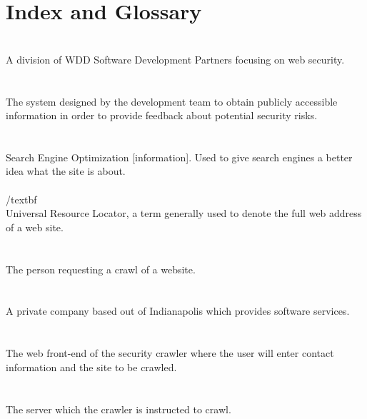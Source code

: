 \section{Index and Glossary}
\textbf{}\\
A division of WDD Software Development Partners focusing on web security.\\\\
\textbf{}\\
The system designed by the development team to obtain publicly accessible information in order to provide feedback about potential security risks.\\\\
\textbf{}\\
Search Engine Optimization [information].  Used to give search engines a better idea what the site is about.\\\\
/textbf{}\\
Universal Resource Locator, a term generally used to denote the full web address of a web site.\\\\
\textbf{}\\
The person requesting a crawl of a website.\\\\
\textbf{}\\
A private company based out of Indianapolis which provides software services.\\\\
\textbf{}\\
The web front-end of the security crawler where the user will enter contact information and the site to be crawled.\\\\
\textbf{}\\
The server which the crawler is instructed to crawl.
